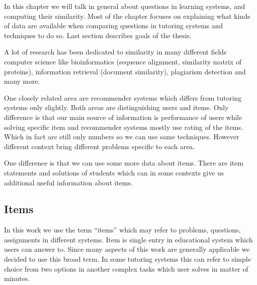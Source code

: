 \documentclass[
  digital, %
  table,   %
  nolof,     %
  nolot,     %
  nocover
]{fithesis3}
\begin{document}



In this chapter we will talk in general about questions in learning
systems, and computing their similarity. Most of the chapter focuses on
explaining what kinds of data are available when comparing questions in
tutoring systems and techniques to do so. Last section describes goals
of the thesis.


A lot of research has been dedicated to similarity in many different
fields computer science like bioinformatics (sequence alignment,
similarity matrix of proteins), information retrieval (document
similarity), plagiarism detection and many more.


One closely related area are recommender systems which differs from tutoring systems only slightly. Both areas are distinguishing users
and items. Only difference is that our main source of information is performance of users while solving specific item and recommender systems mostly use rating of the items. Which in fact are still only numbers so we can use same techniques. However different context bring different problems specific to each area.


One difference is that we can use some more data about items. There are item statements and solutions of students which can in some contexts give us additional useful information about items.

\subsection{Items}\label{items}



In this work we use the term ``items'' which may refer to problems, questions,
assignments in different systems. Item is single entry in educational system which
users can answer to. Since many aspects of this work are generally
applicable we decided to use this broad term. In some tutoring systems
this can refer to simple choice from two options in another complex
tasks which user solves in matter of minutes.
\end{document}
